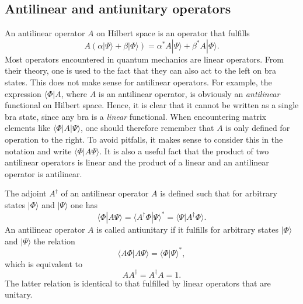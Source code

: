 \subsection{Antilinear and antiunitary operators}
An antilinear operator $A$ on Hilbert space is an operator that fulfills
\begin{equation}
A(\alpha|\Psi\rangle + \beta|\Phi\rangle) = \alpha^\ast A|\Psi\rangle + \beta^\ast A|\Phi\rangle.
\end{equation}
Most operators encountered in quantum mechanics are linear operators. From their theory, one is used to the fact that they can also act to the left on bra states. This does not make sense for antilinear operators. For example, the expression $\langle \Phi|A$, where $A$ is an antilinear operator, is obviously an \emph{antilinear} functional on Hilbert space. Hence, it is clear that it cannot be written as a single bra state, since any bra is a \emph{linear} functional. When encountering matrix elements like $\langle \Phi|A|\Psi\rangle$, one should therefore remember that $A$ is only defined for operation to the right. To avoid pitfalls, it makes sense to consider this in the notation and write $\langle \Phi|A\Psi\rangle$. It is also a useful fact that the product of two antilinear operators is linear and the product of a linear and an antilinear operator is antilinear.

The adjoint $A^\dagger$ of an antilinear operator $A$ is defined such that for arbitrary states $|\Phi\rangle$ and $|\Psi\rangle$ one has
\begin{equation}
\langle \Phi|A\Psi\rangle = \langle A^\dagger\Phi|\Psi\rangle^\ast = \langle \Psi|A^\dagger \Phi\rangle.
\end{equation}
An antilinear operator $A$ is called antiunitary if it fulfills for arbitrary states $|\Phi\rangle$ and $|\Psi\rangle$ the relation
\begin{equation}
\langle A\Phi|A\Psi\rangle = \langle \Phi|\Psi\rangle^\ast,
\end{equation}
which is equivalent to
\begin{equation}
AA^\dagger = A^\dagger A = 1.
\end{equation}
The latter relation is identical to that fulfilled by linear operators that are unitary.

